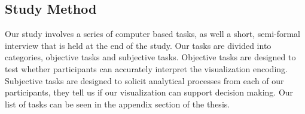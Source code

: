 \subsection{Study Method}
Our study involves a series of computer based tasks, as well a short,
semi-formal interview that is held at the end of the study. Our tasks are
divided into categories, objective tasks and subjective tasks. Objective tasks
are designed to test whether participants can accurately interpret the
visualization encoding. Subjective tasks are designed to solicit analytical
processes from each of our participants, they tell us if our visualization can
support decision making. 
Our list of tasks can be seen in the appendix section of the thesis.


 
